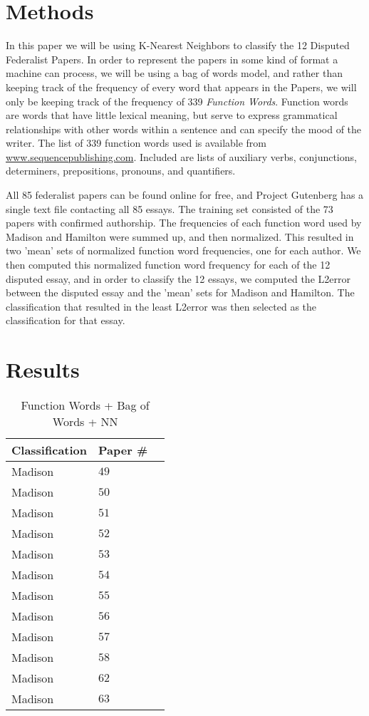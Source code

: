 \documentclass[twoside]{article}
\begin{document}
\begin{multicols}{2}
\section{Methods}
In this paper we will be using K-Nearest Neighbors to classify the 12 Disputed Federalist Papers. In order to represent the papers in some kind of format a machine can process, we will be using a bag of words model, and rather than keeping track of the frequency of every word that appears in the Papers, we will only be keeping track of the frequency of 339 {\it Function Words}. Function words are words that have little lexical meaning, but serve to express grammatical relationships with other words within a sentence and can specify the mood of the writer. The list of 339 function words used is available from \href{http://www.sequencepublishing.com/academic.html}{www.sequencepublishing.com}. Included are lists of auxiliary verbs, conjunctions, determiners, prepositions, pronouns, and quantifiers.

All 85 federalist papers can be found online for free, and Project Gutenberg has a single text file contacting all 85 essays. The training set consisted of the 73 papers with confirmed authorship. The frequencies of each function word used by Madison and Hamilton were summed up, and then normalized. This resulted in two 'mean' sets of normalized function word frequencies, one for each author. We then computed this normalized function word frequency for each of the 12 disputed essay, and in order to classify the 12 essays, we computed the L2error between the disputed essay and the 'mean' sets for Madison and Hamilton. The classification that resulted in the least L2error was then selected as the classification for that essay.


\section{Results}

\begin{table}[H]
\caption{Function Words + Bag of Words + NN}
\centering
\begin{tabular}{llr}
\toprule
\cmidrule(r){1-2}
Classification & Paper \# \\
\midrule
Madison &  $49$ \\
Madison & $50$ \\
Madison & $51$ \\
Madison & $52$ \\
Madison & $53$ \\
Madison & $54$ \\
Madison & $55$ \\
Madison & $56$ \\
Madison & $57$ \\
Madison & $58$ \\
Madison & $62$ \\
Madison & $63$ \\



\end{tabular}
\end{table}
\end{multicols}
\end{document}
